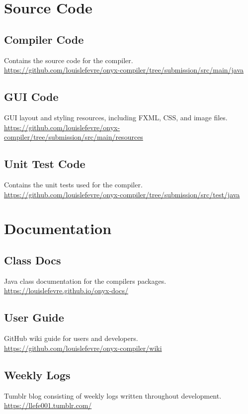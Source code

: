 \documentclass[
]{report}
\begin{document}
\begin{appendices}
	\chapter{Source Code}
	\section{Compiler Code}
	\label{appendix:compiler-code}
	Contains the source code for the compiler.\\
	\url{https://github.com/louislefevre/onyx-compiler/tree/submission/src/main/java}
	\section{GUI Code}
	\label{appendix:gui-code}
	GUI layout and styling resources, including FXML, CSS, and image files.\\
	\url{https://github.com/louislefevre/onyx-compiler/tree/submission/src/main/resources}
	\section{Unit Test Code}
	\label{appendix:unit-test-code}
	Contains the unit tests used for the compiler.\\
	\url{https://github.com/louislefevre/onyx-compiler/tree/submission/src/test/java}

	\chapter{Documentation}
	\section{Class Docs}
	\label{appendix:class-docs}
	Java class documentation for the compilers packages.\\
	\url{https://louislefevre.github.io/onyx-docs/}
	\section{User Guide}
	\label{appendix:user-guide}
	GitHub wiki guide for users and developers.\\
	\url{https://github.com/louislefevre/onyx-compiler/wiki}
	\section{Weekly Logs}
	\label{appendix:weekly-logs}
	Tumblr blog consisting of weekly logs written throughout development.\\
	\url{https://llefe001.tumblr.com/}

\end{appendices}
\end{document}

